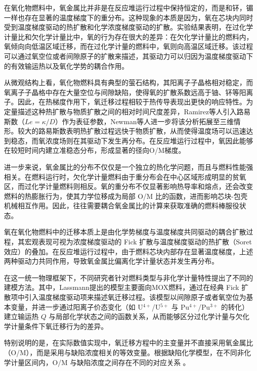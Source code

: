 在氧化物燃料中，氧金属比并非是在反应堆运行过程中保持恒定的，而是和钚，镅一样也存在显著的温度梯度下的重分布。这种现象的本质是因为，氧在芯块内同时受到温度梯度驱动的热扩散和化学浓度梯度驱动的扩散。实验结果表明\cite{ewartOxygenPotentialMeasurements1984}，在过化学计量比和欠化学计量比中，氧的行为存在很大的差异：在欠化学计量比的燃料内，氧倾向向低温区域迁移，而在过化学计量的燃料中，氧则向高温区域迁移。该过程可以通过氧空位或者间隙原子的扩散来描述，其驱动力可以归因为温度梯度驱动下的有效输运热以及氧化学势的耦合作用。

从微观结构上看，氧化物燃料具有典型的萤石结构，其阳离子子晶格相对稳定，而氧离子子晶格中存在大量空位与间隙缺陷，使得氧的扩散系数远高于铀、钚等阳离子。因此，在热梯度作用下，氧迁移过程相较于热传导表现出更快的响应特性。为定量描述这种热扩散与物质扩散之间的相对时间尺度差异，Ramirez等人引入路易斯数（$Le = \kappa / D$）作为表征参数，Newman等人\cite{newmanThreeDimensionalCoupled2009}进一步将该分析拓展至三维情形。较大的路易斯数表明热扩散过程远快于物质扩散，从而使得温度场可以迅速达到稳态，而氧浓度场则在其驱动下发生再分布。在反应堆运行过程中，氧因此能够在较短时间内建立准稳态分布，形成显著的径向O/M梯度。

进一步来说，氧金属比的分布不仅仅是一个独立的热化学问题，而且与燃料性能强相关。在燃料运行时，欠化学计量燃料由于重分布会在中心区域形成明显的贫氧区，而过化学计量燃料则相反。氧的重分布不仅显著影响热导率和熔点，还会改变燃料的热膨胀行为，使其力学位移成为局部 O/M 比的函数，进而影响芯块-包壳机械相互作用。因此，往往需要耦合氧金属比的计算来获取准确的燃料棒服役状态。

氧在氧化物燃料中的迁移本质上是由化学势梯度与温度梯度共同驱动的耦合扩散过程，其宏观表现可视为浓度梯度驱动的 Fick 扩散与温度梯度驱动的热扩散（Soret 效应）的叠加。在反应堆运行过程中，由于燃料芯块内部存在显著温度梯度，上述两种驱动力共同作用，导致氧金属比偏离化学计量状态并发生再分布。

在这一统一物理框架下，不同研究者针对燃料类型与非化学计量特性提出了不同的建模方法。其中，Lassmann\cite{lassmannOxiredModelRedistribution1987}提出的模型主要面向MOX燃料，通过在经典 Fick 扩散项中引入温度梯度驱动项来描述氧迁移过程。该模型以间隙原子或者氧空位为基本变量，并进一步通过阳离子价态变化（如 U$^{4+}$/U$^{5+}$ 与 Pu$^{4+}$/Pu$^{3+}$ 的转化）建立输运热 $Q$ 与局部化学状态之间的函数关系，从而能够区分过化学计量与欠化学计量条件下氧迁移行为的差异。

特别说明的是，在实际数值实现中，氧迁移方程中的主变量并不直接采用氧金属比（O/M），而是采用与缺陷浓度相关的等效变量。根据缺陷化学模型，在不同非化学计量区间内，O/M 与缺陷浓度之间存在不同的对应关系 \cite{lassmannOxiredModelRedistribution1987}。

